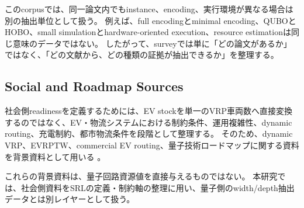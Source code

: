 このcorpusでは、同一論文内でもinstance、encoding、実行環境が異なる場合は別の抽出単位として扱う。
例えば、full encodingとminimal encoding、QUBOとHOBO、small simulationとhardware-oriented execution、resource estimationは同じ意味のデータではない。
したがって、surveyでは単に「どの論文があるか」ではなく、「どの文献から、どの種類の証拠が抽出できるか」を整理する。

\subsection{Social and Roadmap Sources}

社会側readinessを定義するためには、EV stockを単一のVRP車両数へ直接変換するのではなく、EV・物流システムにおける制約条件、運用複雑性、dynamic routing、充電制約、都市物流条件を段階として整理する。
そのため、dynamic VRP、EVRPTW、commercial EV routing、量子技術ロードマップに関する資料を背景資料として用いる
\cite{pillac2013dynamicvrp,schneider2014evrptw,frederhausen2020commercialevrouting,doe2024qisapplicationsroadmap}。

これらの背景資料は、量子回路資源値を直接与えるものではない。
本研究では、社会側資料をSRLの定義・制約軸の整理に用い、量子側のwidth/depth抽出データとは別レイヤーとして扱う。
